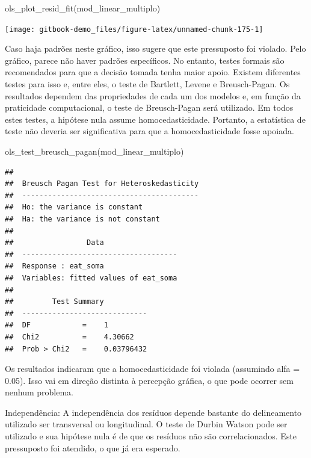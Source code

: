 \documentclass[
]{book}
\newenvironment{Shaded}{\begin{snugshade}}{\end{snugshade}}
\newcommand{\FunctionTok}[1]{\textcolor[rgb]{0.00,0.00,0.00}{#1}}
\newcommand{\NormalTok}[1]{#1}
\begin{document}
\begin{Shaded}
\begin{Highlighting}[]
\FunctionTok{ols\_plot\_resid\_fit}\NormalTok{(mod\_linear\_multiplo)}
\end{Highlighting}
\end{Shaded}

\begin{center}\texttt{[image: gitbook-demo\_files/figure-latex/unnamed-chunk-175-1]} \end{center}

Caso haja padrões neste gráfico, isso sugere que este pressuposto foi violado. Pelo gráfico, parece não haver padrões específicos. No entanto, testes formais são recomendados para que a decisão tomada tenha maior apoio. Existem diferentes testes para isso e, entre eles, o teste de Bartlett, Levene e Breusch-Pagan. Os resultados dependem das propriedades de cada um dos modelos e, em função da praticidade computacional, o teste de Breusch-Pagan será utilizado. Em todos estes testes, a hipótese nula assume homocedasticidade. Portanto, a estatística de teste não deveria ser significativa para que a homocedasticidade fosse apoiada.

\begin{Shaded}
\begin{Highlighting}[]
\FunctionTok{ols\_test\_breusch\_pagan}\NormalTok{(mod\_linear\_multiplo)}
\end{Highlighting}
\end{Shaded}

\begin{verbatim}
## 
##  Breusch Pagan Test for Heteroskedasticity
##  -----------------------------------------
##  Ho: the variance is constant            
##  Ha: the variance is not constant        
## 
##                 Data                 
##  ------------------------------------
##  Response : eat_soma 
##  Variables: fitted values of eat_soma 
## 
##         Test Summary          
##  -----------------------------
##  DF            =    1 
##  Chi2          =    4.30662 
##  Prob > Chi2   =    0.03796432
\end{verbatim}

Os resultados indicaram que a homocedasticidade foi violada (assumindo alfa = 0.05). Isso vai em direção distinta à percepção gráfica, o que pode ocorrer sem nenhum problema.

Independência: A independência dos resíduos depende bastante do delineamento utilizado ser transversal ou longitudinal. O teste de Durbin Watson pode ser utilizado e sua hipótese nula é de que os resíduos não são correlacionados. Este pressuposto foi atendido, o que já era esperado.
\end{document}
